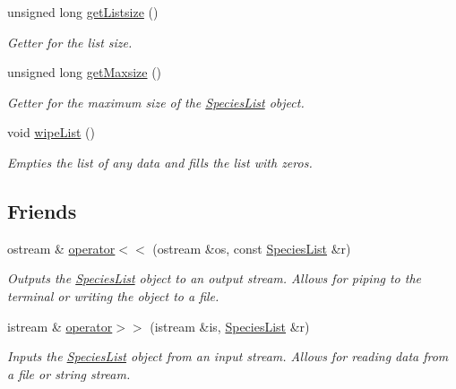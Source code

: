 \begin{DoxyCompactItemize}
unsigned long \hyperlink{class_species_list_a9c6206262b57a450eb92c95f94bd59f7}{get\+Listsize} ()
\begin{DoxyCompactList}\small\item\em Getter for the list size. \end{DoxyCompactList}\item 
unsigned long \hyperlink{class_species_list_ad7d1f16709df32455743995ecb61ed9e}{get\+Maxsize} ()
\begin{DoxyCompactList}\small\item\em Getter for the maximum size of the \hyperlink{class_species_list}{Species\+List} object. \end{DoxyCompactList}\item 
void \hyperlink{class_species_list_acd0fd4ab7517523f04d8c37bb918d390}{wipe\+List} ()\hypertarget{class_species_list_acd0fd4ab7517523f04d8c37bb918d390}{}\label{class_species_list_acd0fd4ab7517523f04d8c37bb918d390}

\begin{DoxyCompactList}\small\item\em Empties the list of any data and fills the list with zeros. \end{DoxyCompactList}\end{DoxyCompactItemize}
\subsection*{Friends}
\begin{DoxyCompactItemize}
\item 
ostream \& \hyperlink{class_species_list_a307fffef634cd0a4615794ef7498cd4a}{operator$<$$<$} (ostream \&os, const \hyperlink{class_species_list}{Species\+List} \&r)
\begin{DoxyCompactList}\small\item\em Outputs the \hyperlink{class_species_list}{Species\+List} object to an output stream. Allows for piping to the terminal or writing the object to a file. \end{DoxyCompactList}\item 
istream \& \hyperlink{class_species_list_a2d74faa6012ce148a9f437249390c294}{operator$>$$>$} (istream \&is, \hyperlink{class_species_list}{Species\+List} \&r)
\begin{DoxyCompactList}\small\item\em Inputs the \hyperlink{class_species_list}{Species\+List} object from an input stream. Allows for reading data from a file or string stream. \end{DoxyCompactList}\end{DoxyCompactItemize}


